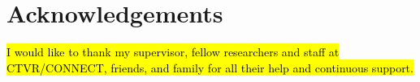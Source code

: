 \chapter*{Acknowledgements}

\hl{I would like to thank my supervisor, fellow researchers and staff at CTVR/CONNECT, friends, and family for all their help and continuous support.}
